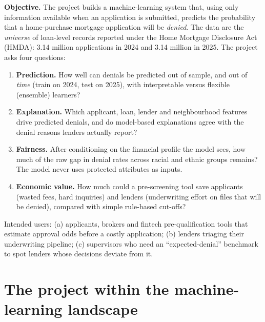 \documentclass[11pt,a4paper]{article}
\begin{document}
\textbf{Objective.} The project builds a machine-learning system that, using only
information available when an application is submitted, predicts the probability that a
home-purchase mortgage application will be \emph{denied}. The data are the
\emph{universe} of loan-level records reported under the Home Mortgage Disclosure Act
(HMDA): 3.14 million applications in 2024 and 3.14 million in 2025. The project asks
four questions:
\begin{enumerate}[label=(\roman*)]
  \item \textbf{Prediction.} How well can denials be predicted out of sample, and out
  of \emph{time} (train on 2024, test on 2025), with interpretable versus flexible
  (ensemble) learners?
  \item \textbf{Explanation.} Which applicant, loan, lender and neighbourhood features
  drive predicted denials, and do model-based explanations agree with the denial
  reasons lenders actually report?
  \item \textbf{Fairness.} After conditioning on the financial profile the model sees,
  how much of the raw gap in denial rates across racial and ethnic groups remains?
  The model never uses protected attributes as inputs.
  \item \textbf{Economic value.} How much could a pre-screening tool save applicants
  (wasted fees, hard inquiries) and lenders (underwriting effort on files that will be
  denied), compared with simple rule-based cut-offs?
\end{enumerate}
Intended users: (a) applicants, brokers and fintech pre-qualification tools that
estimate approval odds before a costly application; (b) lenders triaging their
underwriting pipeline; (c) supervisors who need an ``expected-denial'' benchmark to
spot lenders whose decisions deviate from it.

\section{The project within the machine-learning landscape}
\end{document}
